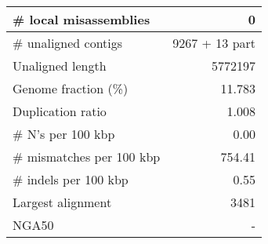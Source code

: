 \documentclass[12pt,a4paper]{article}
\begin{document}
\begin{table}[ht]
\begin{center}
\begin{tabular}{|l*{1}{|r}|}
\# local misassemblies & 0 \\ \hline
\# unaligned contigs & 9267 + 13 part \\ \hline
Unaligned length & 5772197 \\ \hline
Genome fraction (\%) & 11.783 \\ \hline
Duplication ratio & 1.008 \\ \hline
\# N's per 100 kbp & 0.00 \\ \hline
\# mismatches per 100 kbp & 754.41 \\ \hline
\# indels per 100 kbp & 0.55 \\ \hline
Largest alignment & 3481 \\ \hline
NGA50 & - \\ \hline
\end{tabular}
\end{center}
\end{table}
\end{document}
